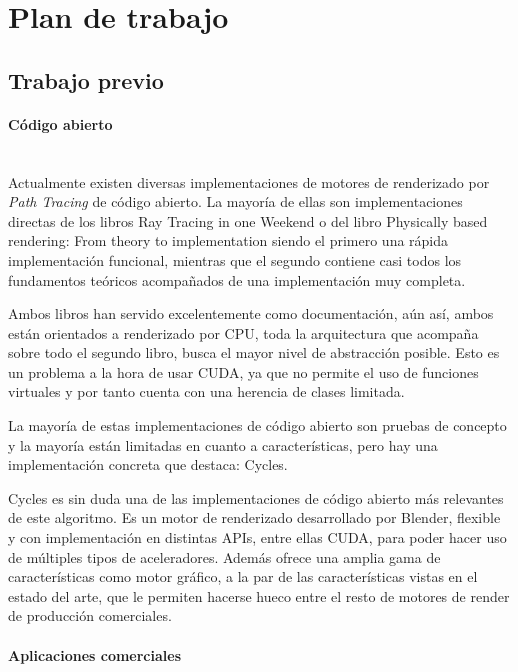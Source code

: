 \section{Plan de trabajo}
	
\subsection{Trabajo previo}

\paragraph{Código abierto}\mbox{} \\

Actualmente existen diversas implementaciones de motores de renderizado por \emph{Path Tracing} de código abierto. La mayoría de ellas son implementaciones directas de los libros Ray Tracing in one Weekend \cite{shirley2016ray} o del libro Physically based rendering: From theory to implementation \cite{pharr2016physically} siendo el primero una rápida implementación funcional, mientras que el segundo contiene casi todos los fundamentos teóricos acompañados de una implementación muy completa.

Ambos libros han servido excelentemente como documentación, aún así, ambos están orientados a renderizado por CPU, toda la arquitectura que acompaña sobre todo el segundo libro, busca el mayor nivel de abstracción posible. Esto es un problema a la hora de usar CUDA, ya que no permite el uso de funciones virtuales y por tanto cuenta con una herencia de clases limitada.

La mayoría de estas implementaciones de código abierto son pruebas de concepto y la mayoría están limitadas en cuanto a características, pero hay una implementación concreta que destaca: Cycles.

Cycles es sin duda una de las implementaciones de código abierto más relevantes de este algoritmo. Es un motor de renderizado desarrollado por Blender, flexible y con implementación en distintas APIs, entre ellas CUDA, para poder hacer uso de múltiples tipos de aceleradores. Además ofrece una amplia gama de características como motor gráfico, a la par de las características vistas en el estado del arte, que le permiten hacerse hueco entre el resto de motores de render de producción comerciales.

\paragraph{Aplicaciones comerciales}\mbox{} \\

